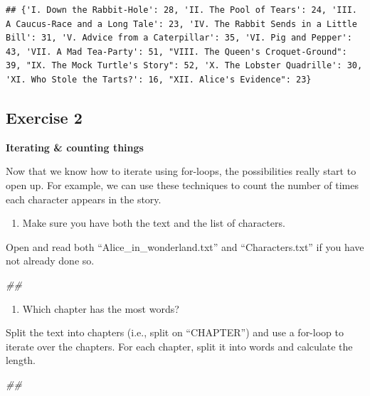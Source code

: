 \documentclass[
]{book}
\newenvironment{Shaded}{\begin{snugshade}}{\end{snugshade}}
\newcommand{\CommentTok}[1]{\textcolor[rgb]{0.56,0.35,0.01}{\textit{#1}}}
\providecommand{\tightlist}{%
  \setlength{\itemsep}{0pt}\setlength{\parskip}{0pt}}
\begin{document}
\begin{verbatim}
## {'I. Down the Rabbit-Hole': 28, 'II. The Pool of Tears': 24, 'III. A Caucus-Race and a Long Tale': 23, 'IV. The Rabbit Sends in a Little Bill': 31, 'V. Advice from a Caterpillar': 35, 'VI. Pig and Pepper': 43, 'VII. A Mad Tea-Party': 51, "VIII. The Queen's Croquet-Ground": 39, "IX. The Mock Turtle's Story": 52, 'X. The Lobster Quadrille': 30, 'XI. Who Stole the Tarts?': 16, "XII. Alice's Evidence": 23}
\end{verbatim}

\hypertarget{exercise-2-3}{%
\subsection{Exercise 2}\label{exercise-2-3}}

\textbf{Iterating \& counting things}

Now that we know how to iterate using for-loops, the possibilities really start to open up. For example, we can use these techniques to count the number of times each character appears in the story.

\begin{enumerate}
\def\labelenumi{\arabic{enumi}.}
\tightlist
\item
  Make sure you have both the text and the list of characters.
\end{enumerate}

Open and read both ``Alice\_in\_wonderland.txt'' and
``Characters.txt'' if you have not already done so.

\begin{Shaded}
\begin{Highlighting}[]
\CommentTok{\#\#}
\end{Highlighting}
\end{Shaded}

\begin{enumerate}
\def\labelenumi{\arabic{enumi}.}
\setcounter{enumi}{1}
\tightlist
\item
  Which chapter has the most words?
\end{enumerate}

Split the text into chapters (i.e., split on ``CHAPTER'') and use a for-loop to iterate over the chapters.
For each chapter, split it into words and calculate the length.

\begin{Shaded}
\begin{Highlighting}[]
\CommentTok{\#\#}
\end{Highlighting}
\end{Shaded}
\end{document}

